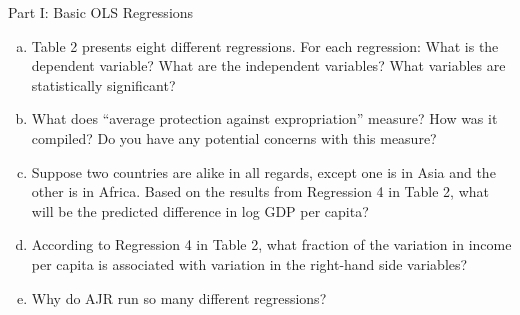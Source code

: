 \documentclass[8pt]{extarticle}
\title{}
\author{Avinash Iyer}
\date{}
\begin{document}
  \begin{problem}{Part I: Basic OLS Regressions}
    \begin{enumerate}[(a)]
      \item Table 2 presents eight different regressions. For each regression: What is the dependent variable? What are the independent variables? What variables are statistically significant?
      \item What does ``average protection against expropriation'' measure? How was it compiled? Do you have any potential concerns with this measure?
      \item Suppose two countries are alike in all regards, except one is in Asia and the other is in Africa. Based on the results from Regression 4 in Table 2, what will be the predicted difference in log GDP per capita?
      \item According to Regression 4 in Table 2, what fraction of the variation in income per capita is associated with variation in the right-hand side variables?
      \item Why do AJR run so many different regressions?
    \end{enumerate}
  \end{problem}
\end{document}
